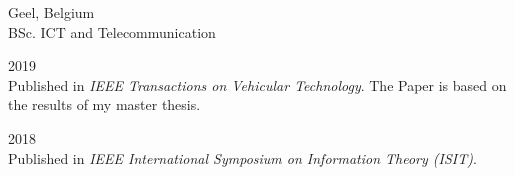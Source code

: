 \documentclass[a4paper,12pt,final]{memoir}
\begin{document}
 \hfill Geel, Belgium \\
BSc. ICT and Telecommunication
\Sep

 \hfill 2019 \\
Published in \emph{IEEE Transactions on Vehicular Technology}. The Paper is based on the results of my master thesis.
\SmallSep

 \hfill 2018 \\
Published in \emph{IEEE International Symposium on Information Theory (ISIT)}.
\Sep

\end{document}

